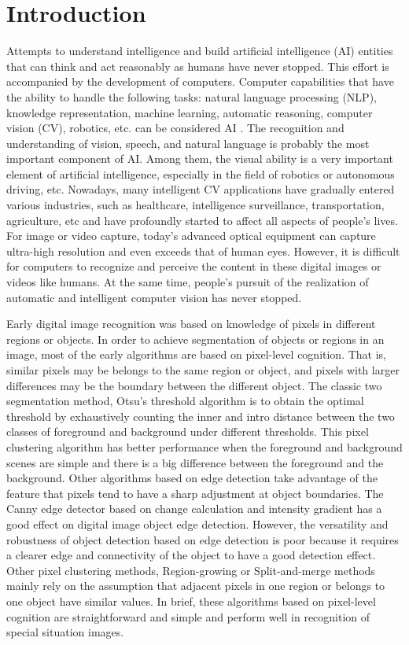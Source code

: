 \documentclass[10pt, a4paper]{IEEEtran} %
\begin{document}
	\section{Introduction} %
	Attempts to understand intelligence and build artificial intelligence (AI) entities that can think and act reasonably as humans have never stopped. This effort is accompanied by the development of computers. Computer capabilities that have the ability to handle the following tasks: natural language processing (NLP), knowledge representation, machine learning, automatic reasoning, computer vision (CV), robotics, etc. can be considered AI \cite{russell2002artificial} . The recognition and understanding of vision, speech, and natural language is probably the most important component of AI. Among them, the visual ability is a very important element of artificial intelligence, especially in the field of robotics or autonomous driving, etc. Nowadays, many intelligent CV applications have gradually entered various industries, such as healthcare, intelligence surveillance, transportation, agriculture, etc and have profoundly started to affect all aspects of people's lives. For image or video capture, today’s advanced optical equipment can capture ultra-high resolution and even exceeds that of human eyes. However, it is difficult for computers to recognize and perceive the content in these digital images or videos like humans. At the same time, people's pursuit of the realization of automatic and intelligent computer vision has never stopped.
	\par 	
	Early digital image recognition was based on knowledge of pixels in different regions or objects. In order to achieve segmentation of objects or regions in an image, most of the early algorithms are based on pixel-level cognition. That is, similar pixels may be belongs to the same region or object, and pixels with larger differences may be the boundary between the different object. The classic two segmentation method, Otsu’s threshold algorithm \cite{otsu1979threshold} is to obtain the optimal threshold by exhaustively counting the inner and intro distance between the two classes of foreground and background under different thresholds. This pixel clustering algorithm has better performance when the foreground and background scenes are simple and there is a big difference between the foreground and the background. Other algorithms based on edge detection take advantage of the feature that pixels tend to have a sharp adjustment at object boundaries. The Canny edge detector \cite{canny1986computational} based on change calculation and intensity gradient has a good effect on digital image object edge detection. However, the versatility and robustness of object detection based on edge detection is poor because it requires a clearer edge and connectivity of the object to have a good detection effect. Other pixel clustering methods, Region-growing or Split-and-merge methods mainly rely on the assumption that adjacent pixels in one region or belongs to one object have similar values. In brief, these algorithms based on pixel-level cognition are straightforward and simple and perform well in recognition of special situation images.
\end{document}
